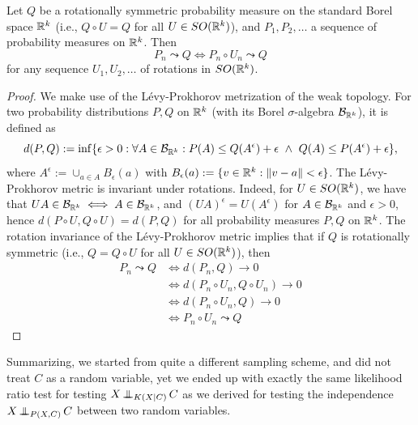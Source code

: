 \begin{Lem}\label{lem:weak_convergence_to_rotationally_symmetric_distribution}
  Let $Q$ be a rotationally symmetric probability measure on the standard Borel space $\mathbb{R}^k$ (i.e., $Q \circ U = Q$ for all $U \in SO(\mathbb{R}^k)$),
  and $P_1,P_2,\dots$ a sequence of probability measures on $\mathbb{R}^k$. Then
  $$P_n \leadsto Q \iff P_n \circ U_n \leadsto Q$$
  for any sequence $U_1,U_2,\dots$ of rotations in $SO(\mathbb{R}^k)$.
\end{Lem}
\begin{proof}
  We make use of the L\'evy-Prokhorov metrization of the weak topology. For two probability distributions $P,Q$ on
  $\mathbb{R}^k$ (with its Borel $\sigma$-algebra $\mathcal{B}_{\mathbb{R}^k}$), 
  it is defined as
  $$d(P,Q) := \inf \{ \epsilon > 0 : \forall A \in \mathcal{B}_{\mathbb{R}^k} : P(A) \le Q(A^\epsilon) + \epsilon \ \land\ Q(A) \le P(A^\epsilon) + \epsilon \},$$
  where $A^\epsilon := \cup_{a \in A} B_\epsilon(a)$ with $B_\epsilon(a) := \{v \in \mathbb{R}^k : \lVert v - a \rVert < \epsilon\}$.
  The L\'evy-Prokhorov metric is invariant under rotations. 
  Indeed, for $U \in SO(\mathbb{R}^k)$, we have that $UA \in \mathcal{B}_{\mathbb{R}^k} \iff A \in \mathcal{B}_{\mathbb{R}^k}$, and $(UA)^\epsilon = U(A^\epsilon)$ for $A \in \mathcal{B}_{\mathbb{R}^k}$ and $\epsilon > 0$, hence $d(P\circ U, Q\circ U) = d(P,Q)$ for all probability measures $P,Q$ on $\mathbb{R}^k$. 
  The rotation invariance of the L\'evy-Prokhorov metric implies that if $Q$ is rotationally symmetric (i.e., $Q = Q \circ U$ for all $U \in SO(\mathbb{R}^k)$), then
  \begin{equation*}\begin{split}
    P_n \leadsto Q 
    &\iff d(P_n,Q) \to 0 \\
    &\iff d(P_n \circ U_n,Q \circ U_n) \to 0 \\
    &\iff d(P_n \circ U_n, Q) \to 0 \\
    &\iff P_n \circ U_n \leadsto Q
  \end{split}\end{equation*}
\end{proof}

Summarizing, we started from quite a different sampling scheme, and did not treat $C$ as a random variable, yet we
ended up with exactly the same likelihood ratio test for testing $X \operatorname*{\perp\mkern-11mu\perp}_{K(X|C)} C$ as we derived 
for testing the independence $X \operatorname*{\perp\mkern-11mu\perp}_{P(X,C)} C$ between two random variables.

